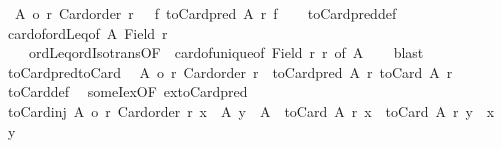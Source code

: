 \begin{isabellebody}
\ \ {\isachardoublequoteopen}{\isasymlbrakk}{\isacharbar}{\kern0pt}A{\isacharbar}{\kern0pt}\ {\isasymle}o\ r{\isacharsemicolon}{\kern0pt}\ Card{\isacharunderscore}{\kern0pt}order\ r{\isasymrbrakk}\ {\isasymLongrightarrow}\ {\isasymexists}\ f{\isachardot}{\kern0pt}\ toCard{\isacharunderscore}{\kern0pt}pred\ A\ r\ f{\isachardoublequoteclose}\isanewline
%
\isadelimproof
\ \ %
\endisadelimproof
%
\isatagproof
{}\isamarkupfalse%
\ toCard{\isacharunderscore}{\kern0pt}pred{\isacharunderscore}{\kern0pt}def\isanewline
\ \ \isamarkupfalse%
\ card{\isacharunderscore}{\kern0pt}of{\isacharunderscore}{\kern0pt}ordLeq{\isacharbrackleft}{\kern0pt}of\ A\ {\isachardoublequoteopen}Field\ r{\isachardoublequoteclose}{\isacharbrackright}{\kern0pt}\isanewline
\ \ \ \ ordLeq{\isacharunderscore}{\kern0pt}ordIso{\isacharunderscore}{\kern0pt}trans{\isacharbrackleft}{\kern0pt}OF\ {\isacharunderscore}{\kern0pt}\ card{\isacharunderscore}{\kern0pt}of{\isacharunderscore}{\kern0pt}unique{\isacharbrackleft}{\kern0pt}of\ {\isachardoublequoteopen}Field\ r{\isachardoublequoteclose}\ r{\isacharbrackright}{\kern0pt}{\isacharcomma}{\kern0pt}\ of\ {\isachardoublequoteopen}{\isacharbar}{\kern0pt}A{\isacharbar}{\kern0pt}{\isachardoublequoteclose}{\isacharbrackright}{\kern0pt}\isanewline
\ \ \isamarkupfalse%
\ blast%
\endisatagproof
{\isafoldproof}%
%
\isadelimproof
\isanewline
%
\endisadelimproof
\isanewline
{}\isamarkupfalse%
\ toCard{\isacharunderscore}{\kern0pt}pred{\isacharunderscore}{\kern0pt}toCard{\isacharcolon}{\kern0pt}\isanewline
\ \ {\isachardoublequoteopen}{\isasymlbrakk}{\isacharbar}{\kern0pt}A{\isacharbar}{\kern0pt}\ {\isasymle}o\ r{\isacharsemicolon}{\kern0pt}\ Card{\isacharunderscore}{\kern0pt}order\ r{\isasymrbrakk}\ {\isasymLongrightarrow}\ toCard{\isacharunderscore}{\kern0pt}pred\ A\ r\ {\isacharparenleft}{\kern0pt}toCard\ A\ r{\isacharparenright}{\kern0pt}{\isachardoublequoteclose}\isanewline
%
\isadelimproof
\ \ %
\endisadelimproof
%
\isatagproof
{}\isamarkupfalse%
\ toCard{\isacharunderscore}{\kern0pt}def\ \isamarkupfalse%
\ someI{\isacharunderscore}{\kern0pt}ex{\isacharbrackleft}{\kern0pt}OF\ ex{\isacharunderscore}{\kern0pt}toCard{\isacharunderscore}{\kern0pt}pred{\isacharbrackright}{\kern0pt}\ \isacommand{{\isachardot}{\kern0pt}}\isamarkupfalse%
%
\endisatagproof
{\isafoldproof}%
%
\isadelimproof
\isanewline
%
\endisadelimproof
\isanewline
{}\isamarkupfalse%
\ toCard{\isacharunderscore}{\kern0pt}inj{\isacharcolon}{\kern0pt}\ {\isachardoublequoteopen}{\isasymlbrakk}{\isacharbar}{\kern0pt}A{\isacharbar}{\kern0pt}\ {\isasymle}o\ r{\isacharsemicolon}{\kern0pt}\ Card{\isacharunderscore}{\kern0pt}order\ r{\isacharsemicolon}{\kern0pt}\ x\ {\isasymin}\ A{\isacharsemicolon}{\kern0pt}\ y\ {\isasymin}\ A{\isasymrbrakk}\ {\isasymLongrightarrow}\ toCard\ A\ r\ x\ {\isacharequal}{\kern0pt}\ toCard\ A\ r\ y\ {\isasymlongleftrightarrow}\ x\ {\isacharequal}{\kern0pt}\ y{\isachardoublequoteclose}\isanewline

\end{isabellebody}
